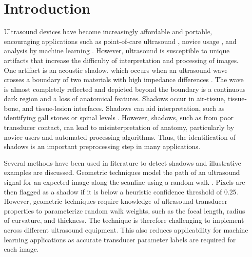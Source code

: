 \documentclass[authoryear,preprint,review,12pt]{elsarticle}
\begin{document}




\section*{Introduction}
\label{intro}
Ultrasound devices have become increasingly affordable and portable, encouraging applications such as point-of-care ultrasound \citep{Bouhemad2011}, novice usage \citep{Sippel2011}, and analysis by machine learning \citep{Ghose2013}. However, ultrasound is susceptible to unique artifacts that increase the difficulty of interpretation and processing of images. One artifact is an acoustic shadow, which occurs when an ultrasound wave crosses a boundary of two materials with high impedance differences \citep{Kremkau1986}. The wave is almost completely reflected and depicted beyond the boundary is a continuous dark region and a loss of anatomical features. Shadows occur in air-tissue, tissue-bone, and tissue-lesion interfaces. Shadows can aid interpretation, such as identifying gall stones \citep{Good1979} or spinal levels \citep{Galiano2005}. However, shadows, such as from poor transducer contact, can lead to misinterpretation of anatomy, particularly by novice users and automated processing algorithms. Thus, the identification of shadows is an important preprocessing step in many applications.

Several methods have been used in literature to detect shadows and illustrative examples are discussed. Geometric techniques model the path of an ultrasound signal for an expected image along the scanline using a random walk \citep{Karamalis2012}. Pixels are then flagged as a shadow if it is below a heuristic confidence threshold of 0.25. However, geometric techniques require knowledge of ultrasound transducer properties to parameterize random walk weights, such as the focal length, radius of curvature, and thickness. The technique is therefore challenging to implement across different ultrasound equipment. This also reduces applicability for machine learning applications as accurate transducer parameter labels are required for each image.
\end{document}
